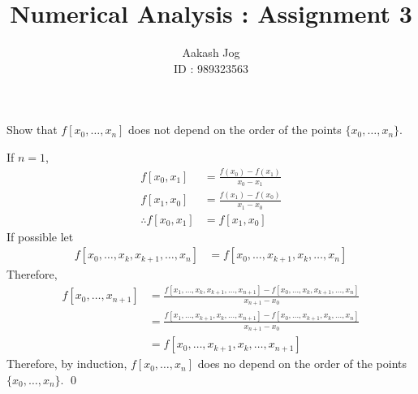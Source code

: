 \documentclass[fleqn, a4paper, 11pt, oneside]{amsart}
\title{Numerical Analysis : Assignment 3}
\author
{
	Aakash Jog\\
	ID : 989323563
}
\date{\formatdate{3}{11}{2015}}
\theoremstyle{definition}
\theoremstyle{theorem}
\begin{document}

\maketitle

\begin{question}
	Show that $f[x_0,\dots,x_n]$ does not depend on the order of the points $\{x_0,\dots,x_n\}$.
\end{question}

\begin{solution}
	If $n = 1$,
	\begin{align*}
		f[x_0,x_1]            & = \frac{f(x_0) - f(x_1)}{x_0 - x_1} \\
		f[x_1,x_0]            & = \frac{f(x_1) - f(x_0)}{x_1 - x_0} \\
		\therefore f[x_0,x_1] & = f[x_1,x_0]
	\end{align*}
	If possible let
	\begin{align*}
		f[x_0,\dots,x_k,x_{k + 1},\dots,x_n] & = f[x_0,\dots,x_{k + 1},x_k,\dots,x_n]
	\end{align*}
	Therefore,
	\begin{align*}
		f[x_0,\dots,x_{n + 1}] & = \frac{f[x_1,\dots,x_k,x_{k + 1},\dots,x_{n + 1}] - f[x_0,\dots,x_k,x_{k + 1},\dots,x_n]}{x_{n + 1} - x_0} \\
                                       & = \frac{f[x_1,\dots,x_{k + 1},x_k,\dots,x_{n + 1}] - f[x_0,\dots,x_{k + 1},x_k,\dots,x_n]}{x_{n + 1} - x_0} \\
                                       & = f[x_0,\dots,x_{k + 1},x_k,\dots,x_{n + 1}]
	\end{align*}
	Therefore, by induction, $f[x_0,\dots,x_n]$ does no depend on the order of the points $\{x_0,\dots,x_n\}$.
	\qed
\end{solution}

\addtocounter{question}{1}
\end{document}

